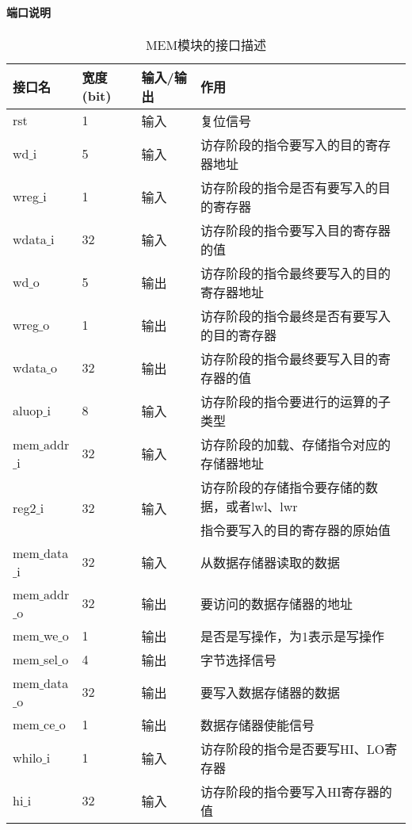 \paragraph{端口说明}
\quad

\quad
\begin{table}[H]
	\centering
	\caption{MEM模块的接口描述}
	\begin{tabular}{|l|l|l|l|}
		\hline
		接口名 & 宽度(bit) & 输入/输出 & 作用 \\
		\hline
		rst & 1 & 输入 & 复位信号 \\
		\hline
		wd$\_$i & 5 & 输入 & 访存阶段的指令要写入的目的寄存器地址 \\
		\hline
		wreg$\_$i & 1 & 输入 & 访存阶段的指令是否有要写入的目的寄存器 \\
		\hline
		wdata$\_$i & 32 & 输入 & 访存阶段的指令要写入目的寄存器的值 \\
		\hline
		wd$\_$o & 5 & 输出 & 访存阶段的指令最终要写入的目的寄存器地址 \\
		\hline
		wreg$\_$o & 1 & 输出 & 访存阶段的指令最终是否有要写入的目的寄存器 \\
		\hline
		wdata$\_$o & 32 & 输出 & 访存阶段的指令最终要写入目的寄存器的值 \\
		\hline
		aluop$\_$i & 8 & 输入 & 访存阶段的指令要进行的运算的子类型 \\
		\hline
		mem$\_$addr$\_$i & 32 & 输入 & 访存阶段的加载、存储指令对应的存储器地址 \\
		\hline
		\multirow{2}{*}{reg2$\_$i} & \multirow{2}{*}{32} & \multirow{2}{*}{输入} & 访存阶段的存储指令要存储的数据，或者lwl、lwr \\
		& & & 指令要写入的目的寄存器的原始值 \\
		\hline
		mem$\_$data$\_$i & 32 & 输入 & 从数据存储器读取的数据 \\
		\hline
		mem$\_$addr$\_$o & 32 & 输出 & 要访问的数据存储器的地址 \\
		\hline
		mem$\_$we$\_$o & 1 & 输出 & 是否是写操作，为1表示是写操作 \\
		\hline
		mem$\_$sel$\_$o & 4 & 输出 & 字节选择信号 \\
		\hline
		mem$\_$data$\_$o & 32 & 输出 & 要写入数据存储器的数据 \\
		\hline
		mem$\_$ce$\_$o & 1 & 输出 & 数据存储器使能信号 \\
		\hline
		whilo$\_$i & 1 & 输入 & 访存阶段的指令是否要写HI、LO寄存器 \\
		\hline
		hi$\_$i & 32 & 输入 & 访存阶段的指令要写入HI寄存器的值 \\

\end{tabular}
\end{table}
